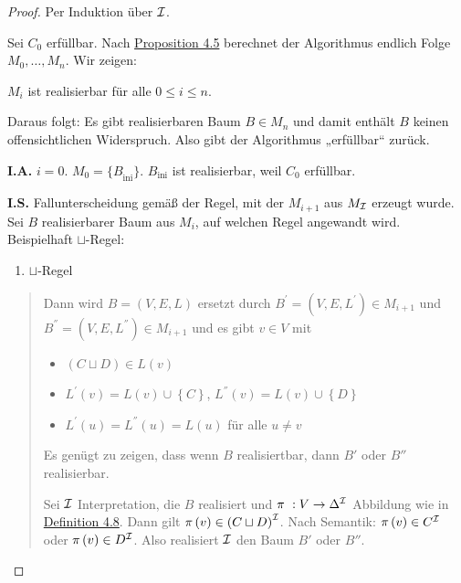 \begin{proof}

Per Induktion über $\mathcal{I}$. 

Sei $C_{0}$ erfüllbar. Nach \protect\hyperlink{proposition-4.5-terminierung}{Proposition 4.5} berechnet der Algorithmus endlich Folge $M_{0},\ldots,M_{n}$. Wir
zeigen: 

$M_{i}$ ist realisierbar für alle $0 \leq i \leq n$. 

Daraus folgt: Es gibt realisierbaren Baum $B \in M_{n}$ und damit enthält $B$ keinen offensichtlichen Widerspruch. Also gibt der Algorithmus „erfüllbar`` zurück.

\textbf{I.A.} $i = 0$. $M_{0} = {\{ B}_{\text{ini}}\}$.
$B_{\text{ini}}$ ist realisierbar, weil $C_{0}$ erfüllbar.

\textbf{I.S.} Fallunterscheidung gemäß der Regel, mit der $M_{i + 1}$
aus $M_{\mathcal{I}}$ erzeugt wurde. Sei $B$ realisierbarer Baum aus
$M_i$, auf welchen Regel angewandt wird. Beispielhaft
$\sqcup$-Regel:

\begin{enumerate}
\def\labelenumi{\arabic{enumi}.}
\item
  $\sqcup$-Regel
\end{enumerate}

\begin{quote}
Dann wird $B = \left( V,E,L \right)$ ersetzt durch
$B^{'} = \left( V,E,L^{'} \right) \in M_{i + 1}$ und
$B^{''} = \left( V,E,L^{''} \right) \in M_{i + 1}$ und es gibt
$v \in V$ mit

\begin{itemize}
\item
  $\left( C \sqcup D \right) \in L(v)$
\item
  $L^{'}\left( v \right) = L\left( v \right) \cup \left\{ C \right\}$,
  $L^{''}\left( v \right) = L\left( v \right) \cup \left\{ D \right\}$
\item
  $L^{'}\left( u \right) = L^{''}\left( u \right) = L\left( u \right)$
  für alle $u \neq v$
\end{itemize}

Es genügt zu zeigen, dass wenn $B$ realisiertbar, dann $B'$ oder
$B''$ realisierbar. 

Sei $\mathcal{I}$ Interpretation, die $B$ realisiert und $\pi\ :V \rightarrow \Delta^{\mathcal{I}}$ Abbildung wie in \protect\hyperlink{realisierbarkeit}{Definition 4.8}. Dann gilt $\pi\left( v \right) \in \left( C \sqcup D \right)^{\mathcal{I}}$. Nach Semantik: $\pi\left( v \right) \in C^{\mathcal{I}}$ oder $\pi\left( v \right) \in D^{\mathcal{I}}$. Also realisiert $\mathcal{I}$ den Baum $B'$ oder $B''$.
\end{quote}
\end{proof}

